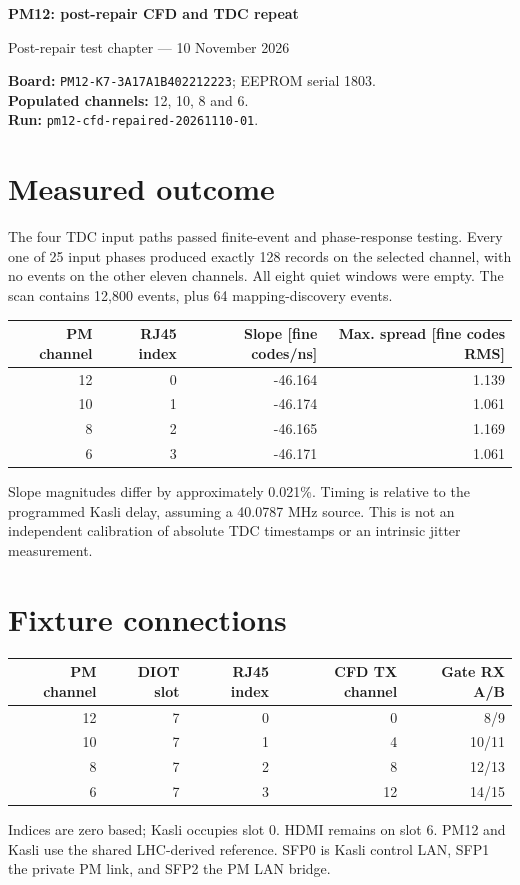 \documentclass[11pt,a4paper]{article}
\begin{document}
{\color{navy}\LARGE\bfseries PM12: post-repair CFD and TDC repeat}\par
{\large Post-repair test chapter --- 10 November 2026}\par
\textbf{Board:} \texttt{PM12-K7-3A17A1B402212223}; EEPROM serial 1803.\\
\textbf{Populated channels:} 12, 10, 8 and 6.\\
\textbf{Run:} \texttt{pm12-cfd-repaired-20261110-01}.
\section*{Measured outcome}
The four TDC input paths passed finite-event and phase-response testing.
Every one of 25 input phases produced exactly 128 records on the selected
channel, with no events on the other eleven channels. All eight quiet windows
were empty. The scan contains 12,800 events, plus 64 mapping-discovery events.

\begin{center}\begin{tabular}{rrrr}\toprule
PM channel & RJ45 index & Slope [fine codes/ns] & Max. spread [fine codes RMS]\\\midrule
12 & 0 & -46.164 & 1.139 \\
10 & 1 & -46.174 & 1.061 \\
8 & 2 & -46.165 & 1.169 \\
6 & 3 & -46.171 & 1.061 \\
\bottomrule\end{tabular}\end{center}

Slope magnitudes differ by approximately 0.021\%. Timing is relative to the
programmed Kasli delay, assuming a 40.0787 MHz source. This is not an independent
calibration of absolute TDC timestamps or an intrinsic jitter measurement.

\section*{Fixture connections}
\begin{center}\begin{tabular}{rrrrr}\toprule
PM channel & DIOT slot & RJ45 index & CFD TX channel & Gate RX A/B\\\midrule
12 & 7 & 0 & 0 & 8/9\\
10 & 7 & 1 & 4 & 10/11\\
8 & 7 & 2 & 8 & 12/13\\
6 & 7 & 3 & 12 & 14/15\\\bottomrule
\end{tabular}\end{center}
Indices are zero based; Kasli occupies slot 0. HDMI remains on slot 6.
PM12 and Kasli use the shared LHC-derived reference. SFP0 is Kasli control LAN,
SFP1 the private PM link, and SFP2 the PM LAN bridge.
\end{document}
